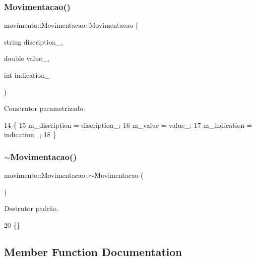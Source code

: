 \subsubsection{\texorpdfstring{Movimentacao()}{Movimentacao()}\hspace{0.1cm}{\footnotesize\ttfamily [2/2]}}
{\footnotesize\ttfamily movimento\+::\+Movimentacao\+::\+Movimentacao (\begin{DoxyParamCaption}\item[{string}]{discription\+\_\+,  }\item[{double}]{value\+\_\+,  }\item[{int}]{indication\+\_\+ }\end{DoxyParamCaption})}



Construtor parametrizado. 


\begin{DoxyCode}
14     \{
15         m\_discription = discription\_;
16         m\_value = value\_;
17         m\_indication = indication\_;
18     \}
\end{DoxyCode}
\mbox{\label{classmovimento_1_1Movimentacao_a77193fb4d3bd0210846c8375c0707ff5}} 
\subsubsection{\texorpdfstring{$\sim$\+Movimentacao()}{~Movimentacao()}}
{\footnotesize\ttfamily movimento\+::\+Movimentacao\+::$\sim$\+Movimentacao (\begin{DoxyParamCaption}{ }\end{DoxyParamCaption})}



Destrutor padrão. 


\begin{DoxyCode}
20 \{\}
\end{DoxyCode}


\subsection{Member Function Documentation}
\mbox{\label{classmovimento_1_1Movimentacao_a60d70ae37cd1513f0a3ea85e29032319}} 
